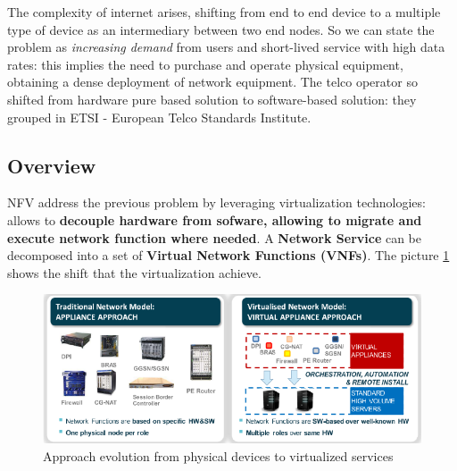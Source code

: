 \documentclass[10pt,a4paper]{report}
\theoremstyle{definition}
\begin{document}
The complexity of internet arises, shifting from end to end device to a multiple type of device as an intermediary between two end nodes.
So we can state the problem as \textit{increasing demand} from users and short-lived service with high data rates: this implies the need to purchase and operate physical equipment, obtaining a dense deployment of network equipment.
The telco operator so shifted from hardware pure based solution to software-based solution: they grouped in ETSI -  European Telco Standards Institute.
\subsection{Overview}\label{sec:key-idea}
NFV address the previous problem by leveraging virtualization technologies: allows to \textbf{decouple hardware from sofware, allowing to migrate and execute network function where needed}.
A \textbf{Network Service} can be decomposed into a set of \textbf{Virtual Network Functions (VNFs)}. The picture \ref{hd-sw-approach} shows the shift that the virtualization achieve.
\begin{figure}
	\centering\includegraphics[scale=0.50]{images/Pasted image 20230405164413.png}
	\caption{Approach evolution from physical devices to virtualized services}
\label{hd-sw-approach}
\end{figure}
\end{document}
